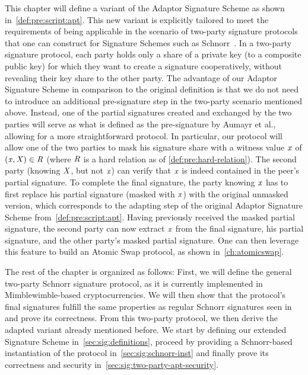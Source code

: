 This chapter will define a variant of the Adaptor Signature Scheme as shown in~\cref{def:pre:script:apt}.
This new variant is explicitly tailored to meet the requirements of being applicable in the scenario of two-party signature protocols that one can construct for Signature Schemes such as Schnorr~\cite{maxwell2019simple}.
In a two-party signature protocol, each party holds only a share of a private key (to a composite public key) for which they want to create a signature cooperatively, without revealing their key share to the other party.
The advantage of our Adaptor Signature Scheme in comparison to the original definition is that we do not need to introduce an additional pre-signature step in the two-party scenario mentioned above.
Instead, one of the partial signatures created and exchanged by the two parties will serve as what is defined as the pre-signature by Aumayr et al., allowing for a more straightforward protocol.
In particular, our protocol will allow one of the two parties to mask his signature share with a witness value $\mathit{x}$ of $(\mathit{x}, \mathit{X}) \in \mathit{R}$ (where $\mathit{R}$ is a hard relation as of \cref{def:pre:hard-relation}).
The second party (knowing $\mathit{X}$, but not $\mathit{x}$) can verify that $\mathit{x}$ is indeed contained in the peer's partial signature.
To complete the final signature, the party knowing $\mathit{x}$ has to first replace his partial signature (masked with $\mathit{x}$) with the original unmasked version, which corresponds to the adapting step of the original Adaptor Signature Scheme from~\cref{def:pre:script:apt}.
Having previously received the masked partial signature, the second party can now extract $\mathit{x}$ from the final signature, his partial signature, and the other party's masked partial signature.
One can then leverage this feature to build an Atomic Swap protocol, as shown in~\cref{ch:atomicswap}.

The rest of the chapter is organized as follows:
First, we will define the general two-party Schnorr signature protocol, as it is currently implemented in Mimblewimble-based cryptocurrencies.
We will then show that the protocol's final signatures fulfill the same properties as regular Schnorr signatures seen in~\cite{schnorr1989efficient} and prove its correctness.
From this two-party protocol, we then derive the adapted variant already mentioned before.
We start by defining our extended Signature Scheme in~\cref{sec:sig:definitions}, proceed by providing a Schnorr-based instantiation of the protocol in~\cref{sec:sig:schnorr-inst} and finally prove its correctness and security in~\cref{sec:sig:two-party-apt-security}.

